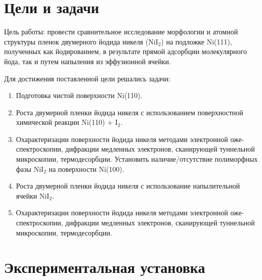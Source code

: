 \documentclass[a4paper,12pt]{article}
\theoremstyle{plain} %
\theoremstyle{definition} %
\theoremstyle{remark} %
\begin{document}

\section{Цели и задачи}

Цель   работы: провести сравнительное исследование морфологии и атомной структуры  пленок двумерного йодида никеля (NiI$_{2}$)  на подложке Ni(111), 
полученных как йодированием, в результате прямой адсорбции  молекулярного йода, так и путем напыления из эффузионной ячейки.  

Для достижения поставленной цели решались  задачи:

\begin{enumerate}
	\item Подготовка чистой поверхности Ni(110).
	\item Роста двумерной пленки йодида никеля с использованием поверхностной химической реакции Ni(110) $+$ I$_{2}$.
	\item Охарактеризации поверхности йодида никеля  методами электронной оже-спектроскопии, дифракции медленных электронов, сканирующей туннельной
 микроскопии, термодесорбции.  Установить наличие/отсутствие  полиморфных фазы NiI$_2$ на поверхности Ni(100).
	\item Роста двумерной пленки йодида никеля с использование напылительной ячейки NiI$_2$.
	\item Охарактеризации  поверхности йодида никеля  методами электронной оже-спектроскопии, дифракции медленных электронов, сканирующей туннельной
 микроскопии, термодесорбции.
\end{enumerate}


\section{Экспериментальная установка}
\end{document}
